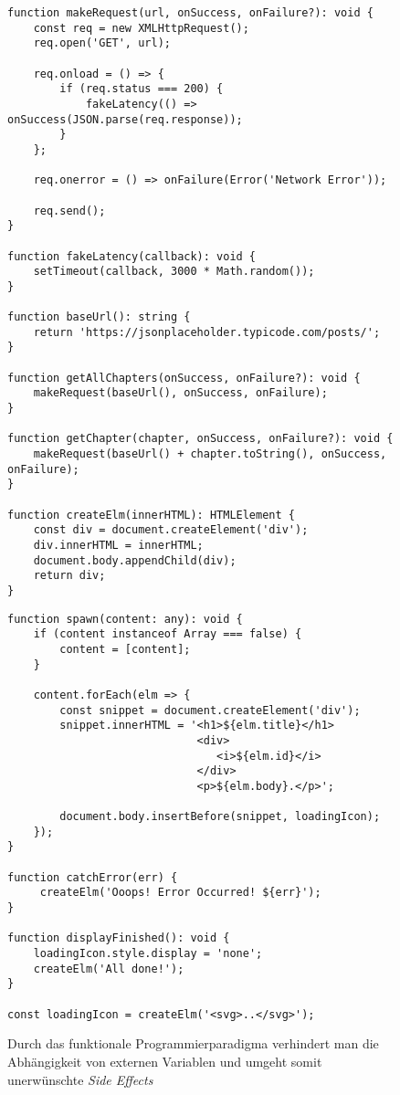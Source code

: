 \begin{figure}[H]
\begin{lstlisting}[basicstyle=\small]
function makeRequest(url, onSuccess, onFailure?): void {
    const req = new XMLHttpRequest();
    req.open('GET', url);

    req.onload = () => {
        if (req.status === 200) {
            fakeLatency(() => onSuccess(JSON.parse(req.response));
        }
    };

    req.onerror = () => onFailure(Error('Network Error'));

    req.send();
}

function fakeLatency(callback): void {
    setTimeout(callback, 3000 * Math.random());
}

function baseUrl(): string {
    return 'https://jsonplaceholder.typicode.com/posts/';
}

function getAllChapters(onSuccess, onFailure?): void {
    makeRequest(baseUrl(), onSuccess, onFailure);
}

function getChapter(chapter, onSuccess, onFailure?): void {
    makeRequest(baseUrl() + chapter.toString(), onSuccess, onFailure);
}

function createElm(innerHTML): HTMLElement {
    const div = document.createElement('div');
    div.innerHTML = innerHTML;
    document.body.appendChild(div);
    return div;
}
\end{lstlisting}
\end{figure}

\begin{figure}[H]
\begin{lstlisting}[basicstyle=\small]
function spawn(content: any): void {
    if (content instanceof Array === false) {
        content = [content];
    }

    content.forEach(elm => {
        const snippet = document.createElement('div');
        snippet.innerHTML = '<h1>${elm.title}</h1>
                             <div>
                                <i>${elm.id}</i>
                             </div>
                             <p>${elm.body}.</p>';

        document.body.insertBefore(snippet, loadingIcon);
    });
}

function catchError(err) {
     createElm('Ooops! Error Occurred! ${err}');
}

function displayFinished(): void {
    loadingIcon.style.display = 'none';
    createElm('All done!');
}

const loadingIcon = createElm('<svg>..</svg>');
\end{lstlisting}
\caption{Durch das funktionale Programmierparadigma verhindert man die Abhängigkeit von externen Variablen und umgeht somit unerwünschte \textit{Side Effects}}
\end{figure}

